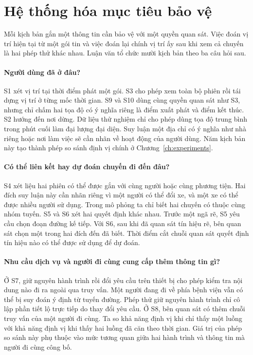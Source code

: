 \section{Hệ thống hóa mục tiêu bảo vệ}
Mỗi kịch bản gắn một thông tin cần bảo vệ với một quyền quan sát. Việc đoán vị trí hiện tại
từ một gói tin và việc đoán lại chính vị trí ấy sau khi xem cả chuyến là hai phép thử khác nhau.
Luận văn tổ chức mười kịch bản theo ba câu hỏi sau.

\paragraph{Người dùng đã ở đâu?}
S1 xét vị trí tại thời điểm phát một gói. S3 cho phép xem toàn bộ phiên rồi tái dựng vị trí
ở từng mốc thời gian. S9 và S10 dùng cùng quyền quan sát như S3, nhưng chỉ chấm hai tọa độ có
ý nghĩa riêng là điểm xuất phát và điểm kết thúc. S2 hướng đến nơi dừng. Dữ liệu thử nghiệm
chỉ cho phép dùng tọa độ trung bình trong phút cuối làm đại lượng đại diện. Suy luận một
địa chỉ có ý nghĩa như nhà riêng hoặc nơi làm việc sẽ cần nhãn về hoạt động của người dùng.
Năm kịch bản này tạo thành phép so sánh định vị chính ở Chương~\ref{ch:experiments}.

\paragraph{Có thể liên kết hay dự đoán chuyến đi đến đâu?}
S4 xét liệu hai phiên có thể được gắn với cùng người hoặc cùng phương tiện. Hai đích suy luận
này cần nhãn riêng vì một người có thể đổi xe, và một xe có thể được nhiều người sử dụng.
Trong mô phỏng ta chỉ biết hai chuyến có thuộc cùng nhóm tuyến. S5 và S6 xét hai quyết định khác
nhau. Trước một ngã rẽ, S5 yêu cầu chọn đoạn đường kế tiếp. Với S6, sau khi đã quan sát tín hiệu
rẽ, bên quan sát chọn một trong hai đích đến đã biết. Thời điểm cắt chuỗi quan sát quyết định
tín hiệu nào có thể được sử dụng để dự đoán.

\paragraph{Nhu cầu dịch vụ và người đi cùng cung cấp thêm thông tin gì?}
Ở S7, giữ nguyên hành trình rồi đổi yêu cầu trên thiết bị cho phép kiểm tra nội dung nào đi ra
ngoài qua truy vấn. Một người đang đi về phía bệnh viện vẫn có thể bị suy đoán ý định từ tuyến
đường. Phép thử giữ nguyên hành trình chỉ cô lập phần tiết lộ trực tiếp do thay đổi yêu cầu.
Ở S8, bên quan sát có thêm chuỗi truy vấn của một người đi cùng. Ta so khả năng định vị khi
chỉ thấy một luồng với khả năng định vị khi thấy hai luồng đã căn theo thời gian. Giá trị
của phép so sánh này phụ thuộc vào mức tương quan giữa hai hành trình và thông tin mà người
đi cùng công bố.

